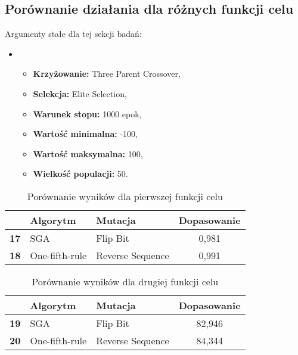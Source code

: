 \documentclass{classrep}
\begin{document}
\subsection{Porównanie działania dla różnych funkcji celu}

Argumenty stałe dla tej sekcji badań:
\begin{itemize}
    \item[]
    \begin{itemize}
        \item \textbf{Krzyżowanie:} Three Parent Crossover,
        \item \textbf{Selekcja:} Elite Selection,
        \item \textbf{Warunek stopu:} 1000 epok,
        \item \textbf{Wartość minimalna:} -100,
        \item \textbf{Wartość maksymalna:} 100,
        \item \textbf{Wielkość populacji:} 50.
    \end{itemize}
\end{itemize}

\begin{table}[H]
\centering
\begin{tabular}{|l|l|l|c|}
\hline
             & \textbf{Algorytm} & \textbf{Mutacja}  & \textbf{Dopasowanie} \\ \hline
\textbf{17} & SGA                & Flip Bit          & 0,981                \\ \hline
\textbf{18} & One-fifth-rule     & Reverse Sequence  & 0,991                \\ \hline
\end{tabular}
\caption{Porównanie wyników dla pierwszej funkcji celu}
\label{tab:calc3}
\end{table}

\begin{table}[H]
\centering
\begin{tabular}{|l|l|l|c|}
\hline
             & \textbf{Algorytm} & \textbf{Mutacja}  & \textbf{Dopasowanie} \\ \hline
\textbf{19} & SGA               & Flip Bit          & 82,946               \\ \hline
\textbf{20} & One-fifth-rule    &  Reverse Sequence & 84,344               \\ \hline
\end{tabular}
\caption{Porównanie wyników dla drugiej funkcji celu}
\label{tab:calc4}
\end{table}
\end{document}
